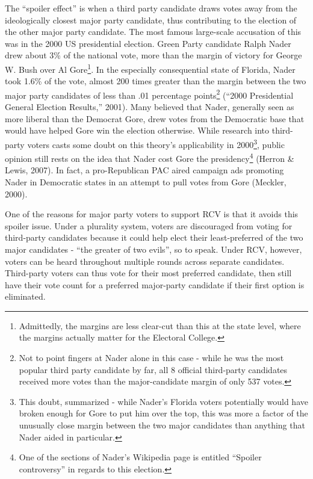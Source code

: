 \documentclass[12pt,twoside]{reedthesis}
\begin{document}
The ``spoiler effect'' is when a third party candidate draws votes away from the ideologically closest major party candidate, thus contributing to the election of the other major party candidate. The most famous large-scale accusation of this was in the 2000 US presidential election. Green Party candidate Ralph Nader drew about 3\% of the national vote, more than the margin of victory for George W. Bush over Al Gore\footnote{Admittedly, the margins are less clear-cut than this at the state level, where the margins actually matter for the Electoral College.}. In the especially consequential state of Florida, Nader took 1.6\% of the vote, almost 200 times greater than the margin between the two major party candidates of less than .01 percentage points\footnote{Not to point fingers at Nader alone in this case - while he was the most popular third party candidate by far, all 8 official third-party candidates received more votes than the major-candidate margin of only 537 votes.} (``2000 Presidential General Election Results,'' 2001). Many believed that Nader, generally seen as more liberal than the Democrat Gore, drew votes from the Democratic base that would have helped Gore win the election otherwise. While research into third-party voters casts some doubt on this theory's applicability in 2000\footnote{This doubt, summarized - while Nader's Florida voters potentially would have broken enough for Gore to put him over the top, this was more a factor of the unusually close margin between the two major candidates than anything that Nader aided in particular.}, public opinion still rests on the idea that Nader cost Gore the presidency\footnote{One of the sections of Nader's Wikipedia page is entitled ``Spoiler controversy'' in regards to this election.} (Herron \& Lewis, 2007). In fact, a pro-Republican PAC aired campaign ads promoting Nader in Democratic states in an attempt to pull votes from Gore (Meckler, 2000).

One of the reasons for major party voters to support RCV is that it avoids this spoiler issue. Under a plurality system, voters are discouraged from voting for third-party candidates because it could help elect their least-preferred of the two major candidates - ``the greater of two evils'', so to speak. Under RCV, however, voters can be heard throughout multiple rounds across separate candidates. Third-party voters can thus vote for their most preferred candidate, then still have their vote count for a preferred major-party candidate if their first option is eliminated.
\end{document}
